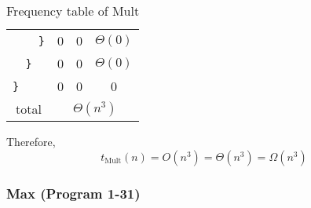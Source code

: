 \documentclass{article}
\begin{document}
\begin{table}[H]
\begin{tabular}{|l|c|c|c|}
        \verb|    }|                                   & 0                                   & 0             & $\Theta(0)$   \\
        \verb|  }|                                     & 0                                   & 0             & $\Theta(0)$   \\
        \verb|}|                                       & 0                                   & 0             & 0             \\
        \hline
        \multicolumn{1}{|c|}{total}                    & \multicolumn{3}{|c|}{$\Theta(n^3)$}                                 \\
        \hline
    \end{tabular}
    \caption{Frequency table of Mult}
\end{table}

Therefore,
\begin{equation}
    \boxed{t_{\text{Mult}}(n) = O(n^3) = \Theta(n^3) = \Omega(n^3)}
\end{equation}

\subsubsection{Max (Program 1-31)}

\end{document}
